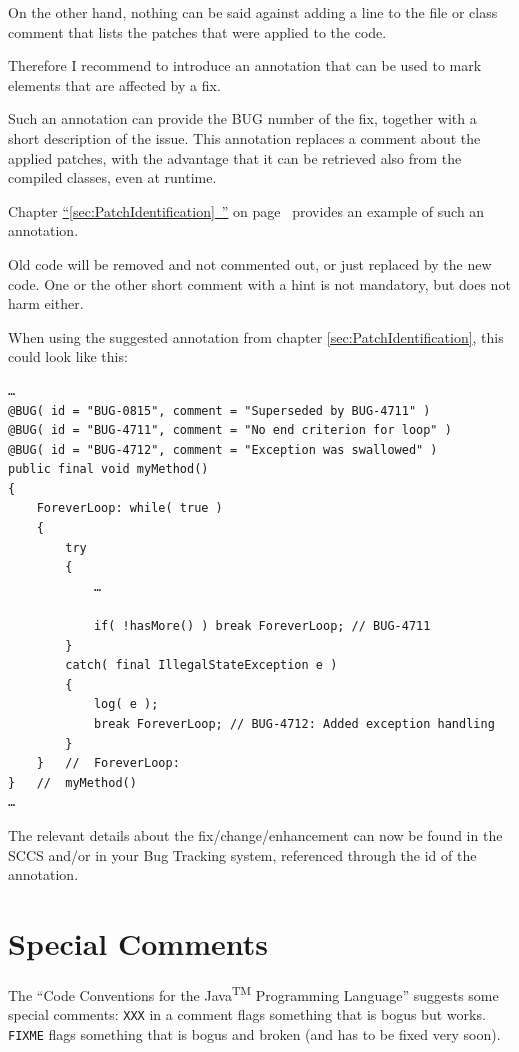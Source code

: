 \documentclass[11pt,a4paper, titlepage, parskip=half, headsepline, footsepline, cleardoublepage=current, headheight=1cm]{scrbook}
\newcommand*{\tqfullvref}[1]{\hyperref[{#1}]{“\ref*{#1}~\nameref*{#1}”} on page~\pageref{#1}}
\newcommand*{\tqref}[1]{\hyperref[{#1}]{\ref*{#1}}}
\begin{document}
On the other hand, nothing can be said against adding a line to the file or class comment that lists the patches that were applied to the code.

Therefore I recommend to introduce an annotation that can be used to mark elements that are affected by a fix.

Such an annotation can provide the BUG number of the fix, together with a short description of the issue. This annotation replaces a comment about the applied patches, with the advantage that it can be retrieved also from the compiled classes, even at runtime.

Chapter \tqfullvref{sec:PatchIdentification} provides an example of such an annotation.

Old code will be removed and not commented out, or just replaced by the new code. One or the other short comment with a hint is not mandatory, but does not harm either.

When using the suggested annotation from chapter \tqref{sec:PatchIdentification}, this could look like this:
\begin{lstlisting}
…
@BUG( id = "BUG-0815", comment = "Superseded by BUG-4711" )
@BUG( id = "BUG-4711", comment = "No end criterion for loop" )
@BUG( id = "BUG-4712", comment = "Exception was swallowed" )
public final void myMethod()
{
    ForeverLoop: while( true )
    {
        try
        {
            …
            
            if( !hasMore() ) break ForeverLoop; // BUG-4711
        }
        catch( final IllegalStateException e )
        {
            log( e );
            break ForeverLoop; // BUG-4712: Added exception handling
        }
    }   //  ForeverLoop:
}   //  myMethod()
…
\end{lstlisting}

The relevant details about the fix/change/enhancement can now be found in the SCCS and/or in your Bug Tracking system, referenced through the id of the annotation.


\section{Special Comments}
The “Code Conventions for the Java\textsuperscript{TM} Programming Language”\autocite{SUN_CODE_CONVENTIONS:SpecialComments} suggests some special comments: \verb#XXX# in a comment flags something that is bogus but works. \verb#FIXME# flags something that is bogus and broken (and has to be fixed very soon).
\end{document}
